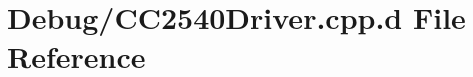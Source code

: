 \hypertarget{_debug_2_c_c2540_driver_8cpp_8d}{\section{\-Debug/\-C\-C2540\-Driver.cpp.\-d \-File \-Reference}
\label{_debug_2_c_c2540_driver_8cpp_8d}
}
